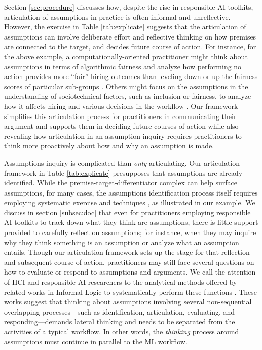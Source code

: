 Section \ref{sec:procedure} discusses how, despite the rise in responsible AI toolkits, articulation of assumptions in practice is often informal and unreflective. 
However, the exercise in Table \ref{tab:explicate} suggests that the articulation of assumptions can involve deliberate effort and reflective thinking on how premises are connected to the target, and decides future course of action.
For instance, for the above example, a computationally-oriented practitioner might think about assumptions in terms of algorithmic fairness and analyze how performing no action provides more ``fair'' hiring outcomes than leveling down or up the fairness scores of particular sub-groups \cite{mittelstadt2023unfairness,corbett-daviesMeasureMismeasureFairness2018,cooper2020normative}.
Others might focus on the assumptions in the understanding of sociotechnical factors, such as inclusion or fairness, to analyze how it affects hiring and various decisions in the workflow \cite{wangFactorsInfluencingPerceived2020,pfeiffer2023algorithmic,dolata2022sociotechnical}.
Our framework simplifies this articulation process for practitioners in communicating their argument and supports them in deciding future courses of action while also revealing how articulation in an assumption inquiry requires practitioners to think more proactively about how and why an assumption is made.

Assumptions inquiry is  complicated than \textit{only} articulating. Our articulation framework in Table \ref{tab:explicate} presupposes that assumptions are already identified. While the premise-target-differentiator complex can help surface assumptions, for many cases, the assumptions identification process itself requires employing systematic exercise and techniques \cite{walton2012argument,palau2009argumentation}, as illustrated in our example. We discuss in section \ref{subsec:doc} that even for practitioners employing responsible AI toolkits to track down what they think are assumptions, there is little support provided to carefully reflect on assumptions; for instance, when they may inquire why they think something is an assumption or analyze what an assumption entails. Though our articulation framework sets up the stage for that reflection and subsequent course of action, practitioners may still face several questions on how to evaluate or respond to assumptions and arguments. We call the attention of HCI and responsible AI researchers to the analytical methods offered by related works in Informal Logic to systematically perform these functions \cite{walton2008argumentation,govier2018problems,govier2010practical,blair2019judging}. These works suggest that thinking about assumptions involving several non-sequential overlapping processes---such as identification, articulation, evaluating, and responding---demands lateral thinking and needs to be separated from the activities of a typical workflow. In other words, the \textit{thinking} process around assumptions must continue in parallel to the ML workflow.
 
